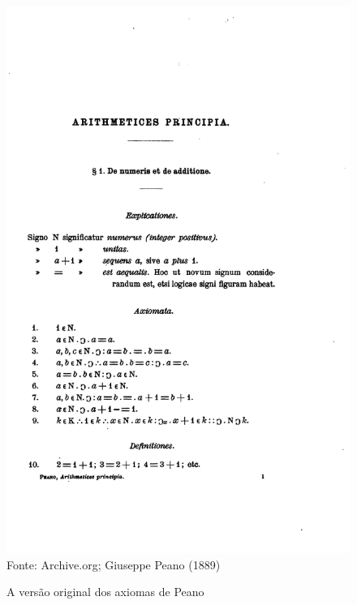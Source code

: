 \documentclass[../main.tex]{subfiles}
\begin{document}
\begin{figure}
    \begin{center}
        \caption{A versão original dos axiomas de Peano}\label{fig:axiomas-peano}
        \hbox{\includegraphics[scale=1]{../include/peano_axioms_original}}
        Fonte: Archive.org; Giuseppe Peano (1889)
    \end{center}  
\end{figure}
\end{document}
